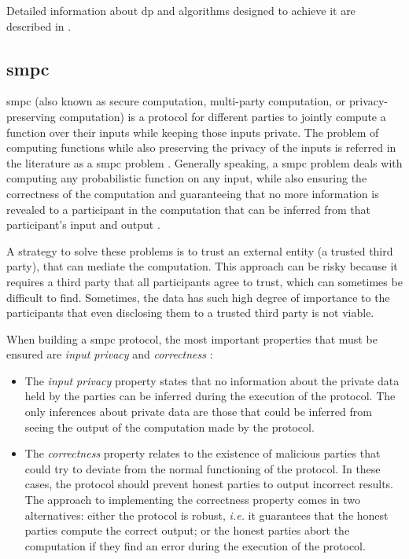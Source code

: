 Detailed information about \ac{dp} and algorithms designed to achieve it are described in \cite{dwork2014algorithmic}.


\subsection{\acl{smpc}} 
\label{ssec:SecureMultiPartyComputation}


\acf{smpc} (also known as secure computation, multi-party computation, or privacy-preserving computation) is a protocol for different parties to jointly compute a function over their inputs while keeping those inputs private. The problem of computing functions while also preserving the privacy of the inputs is referred in the literature as a \ac{smpc} problem \cite{yao1982protocols}. Generally speaking, a \ac{smpc} problem deals with computing any probabilistic function on any input, while also ensuring the correctness of the computation and guaranteeing that no more information is revealed to a participant in the computation that can be inferred from that participant's input and output \cite{goldwasser1997multi}. 

A strategy to solve these problems is to trust an external entity (a trusted third party), that can mediate the computation. This approach can be risky because it requires a third party that all participants agree to trust, which can sometimes be difficult to find. Sometimes, the data has such high degree of importance to the participants that even disclosing them to a trusted third party is not viable.

When building a \ac{smpc} protocol, the most important properties that must be ensured are \textit{input privacy} and \textit{correctness} \cite{goldreich1998secure}:

\begin{itemize}
    

    \item The \textit{input privacy} property states that no information about the private data held by the parties can be inferred during the execution of the protocol. The only inferences about private data are those that could be inferred from seeing the output of the computation made by the protocol.

    \item The \textit{correctness} property relates to the existence of malicious parties that could try to deviate from the normal functioning of the protocol. In these cases, the protocol should prevent honest parties to output incorrect results. The approach to implementing the correctness property comes in two alternatives: either the protocol is robust, \textit{i.e.} it guarantees that the honest parties compute the correct output; or the honest parties abort the computation if they find an error during the execution of the protocol.
\end{itemize}

